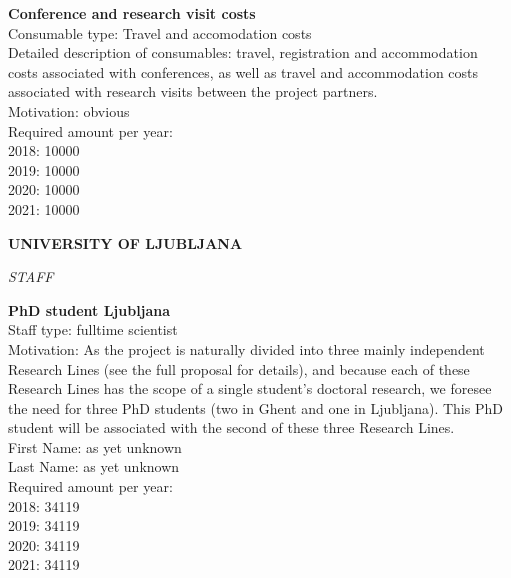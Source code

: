 \documentclass[11pt,dvipsnames,usenames,a4paper]{article}
\begin{document}
{\bf Conference and research visit costs}\\
Consumable type: Travel and accomodation costs\\
Detailed description of consumables: travel, registration and accommodation costs associated with conferences, as well as travel and accommodation costs associated with research visits between the project partners.\\
Motivation: obvious\\
Required amount per year:\\
2018: 10000\\
2019: 10000\\
2020: 10000\\
2021: 10000

\newpage
{\bf UNIVERSITY OF LJUBLJANA}

{\it STAFF}

\textbf{PhD student Ljubljana} \\
Staff type: fulltime scientist\\
Motivation: As the project is naturally divided into three mainly independent Research Lines (see the full proposal for details), and because each of these Research Lines has the scope of a single student's doctoral research, we foresee the need for three PhD students (two in Ghent and one in Ljubljana). This PhD student will be associated with the second of these three Research Lines.\\
First Name: as yet unknown\\
Last Name: as yet unknown\\
Required amount per year:\\
2018: 34119\\
2019: 34119\\
2020: 34119\\
2021: 34119

\end{document}
